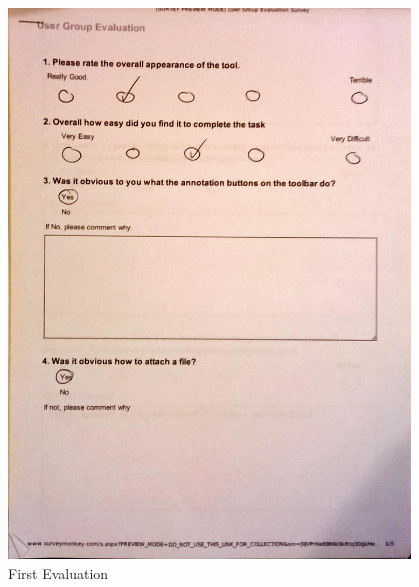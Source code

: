 \begin{figure}[h!]
    \centering
    \includegraphics[width=0.95\textwidth]{images/user_eval/user_eval_1.jpg}
    \caption{First Evaluation}
\end{figure}


